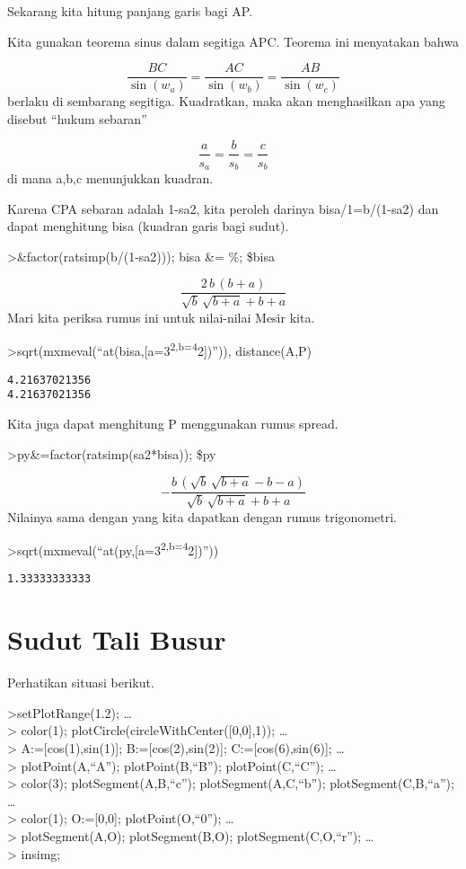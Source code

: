 \documentclass[
]{book}
\begin{document}
Sekarang kita hitung panjang garis bagi AP.

Kita gunakan teorema sinus dalam segitiga APC. Teorema ini menyatakan bahwa

\[\frac{BC}{\sin(w_a)} = \frac{AC}{\sin(w_b)} = \frac{AB}{\sin(w_c)}\]berlaku di sembarang segitiga. Kuadratkan, maka akan menghasilkan apa yang disebut ``hukum sebaran''

\[\frac{a}{s_a} = \frac{b}{s_b} = \frac{c}{s_b}\]di mana a,b,c menunjukkan kuadran.

Karena CPA sebaran adalah 1-sa2, kita peroleh darinya bisa/1=b/(1-sa2) dan dapat menghitung bisa (kuadran garis bagi sudut).

\textgreater\&factor(ratsimp(b/(1-sa2))); bisa \&= \%; \$bisa

\[\frac{2\,b\,\left(b+a\right)}{\sqrt{b}\,\sqrt{b+a}+b+a}\]Mari kita periksa rumus ini untuk nilai-nilai Mesir kita.

\textgreater sqrt(mxmeval(``at(bisa,{[}a=3\textsuperscript{2,b=4}2{]})'')), distance(A,P)

\begin{verbatim}
4.21637021356
4.21637021356
\end{verbatim}

Kita juga dapat menghitung P menggunakan rumus spread.

\textgreater py\&=factor(ratsimp(sa2*bisa)); \$py

\[-\frac{b\,\left(\sqrt{b}\,\sqrt{b+a}-b-a\right)}{\sqrt{b}\,\sqrt{b+a}+b+a}\]Nilainya sama dengan yang kita dapatkan dengan rumus trigonometri.

\textgreater sqrt(mxmeval(``at(py,{[}a=3\textsuperscript{2,b=4}2{]})''))

\begin{verbatim}
1.33333333333
\end{verbatim}

\section{Sudut Tali Busur}\label{sudut-tali-busur}

Perhatikan situasi berikut.

\textgreater setPlotRange(1.2); \ldots{}\\
\textgreater{} color(1); plotCircle(circleWithCenter({[}0,0{]},1)); \ldots{}\\
\textgreater{} A:={[}cos(1),sin(1){]}; B:={[}cos(2),sin(2){]}; C:={[}cos(6),sin(6){]}; \ldots{}\\
\textgreater{} plotPoint(A,``A''); plotPoint(B,``B''); plotPoint(C,``C''); \ldots{}\\
\textgreater{} color(3); plotSegment(A,B,``c''); plotSegment(A,C,``b''); plotSegment(C,B,``a''); \ldots{}\\
\textgreater{} color(1); O:={[}0,0{]}; plotPoint(O,``0''); \ldots{}\\
\textgreater{} plotSegment(A,O); plotSegment(B,O); plotSegment(C,O,``r''); \ldots{}\\
\textgreater{} insimg;
\end{document}
